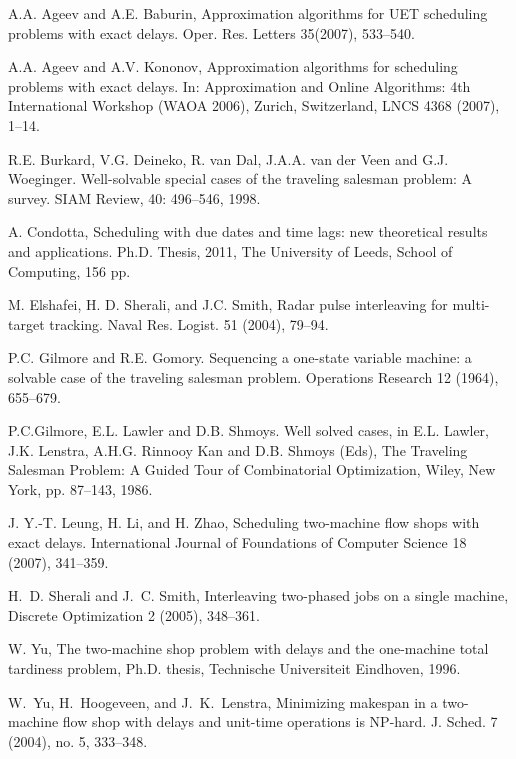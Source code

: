 \documentclass[12pt,a4paper]{article}
\begin{document}
\begin{thebibliography}{}
%
%

  A.A. Ageev and  A.E. Baburin,
Approximation algorithms for UET scheduling problems with exact
delays. Oper. Res. Letters 35(2007), 533--540.

 A.A. Ageev and A.V. Kononov, Approximation algorithms for
scheduling  problems with exact delays. In: Approximation and Online
Algorithms: 4th International Workshop (WAOA 2006), Zurich,
Switzerland, LNCS 4368 (2007), 1--14.

 R.E. Burkard, V.G. Deineko, R. van Dal, J.A.A. van der Veen and G.J. Woeginger.
Well-solvable special cases of the traveling salesman problem: A
survey. SIAM Review, 40: 496--546, 1998.

 A. Condotta, Scheduling with due dates and time lags:
new theoretical results and applications. Ph.D. Thesis, 2011, The
University of Leeds, School of Computing, 156 pp.


 M. Elshafei, H. D. Sherali, and J.C. Smith, Radar pulse
interleaving for multi-target tracking. Naval Res. Logist. 51
(2004), 79--94.


 P.C. Gilmore and R.E. Gomory.
Sequencing a one-state variable machine: a solvable case of the
traveling salesman problem. Operations Research 12 (1964), 655--679.

 P.C.Gilmore, E.L. Lawler and D.B. Shmoys. Well solved cases, in E.L. Lawler,
J.K. Lenstra, A.H.G. Rinnooy Kan and D.B. Shmoys (Eds), The
Traveling Salesman Problem: A Guided Tour of Combinatorial
Optimization, Wiley, New York, pp. 87--143, 1986.


J. Y.-T. Leung, H. Li, and H. Zhao,
Scheduling two-machine flow shops with exact delays. International
Journal of Foundations of Computer Science 18 (2007), 341--359.


 H.~D. Sherali and J.~C. Smith, Interleaving
two-phased jobs on a single machine, Discrete Optimization 2 (2005),
348--361.

 W. Yu, The two-machine  shop problem with delays and the one-machine total
tardiness problem, Ph.D. thesis, Technische Universiteit Eindhoven,
1996.

W.~Yu, H.~Hoogeveen, and J.~K.~Lenstra,
Minimizing makespan in a two-machine flow shop with delays and
unit-time operations is NP-hard. J. Sched. 7 (2004), no. 5,
333--348.



\end{thebibliography}
\end{document}
